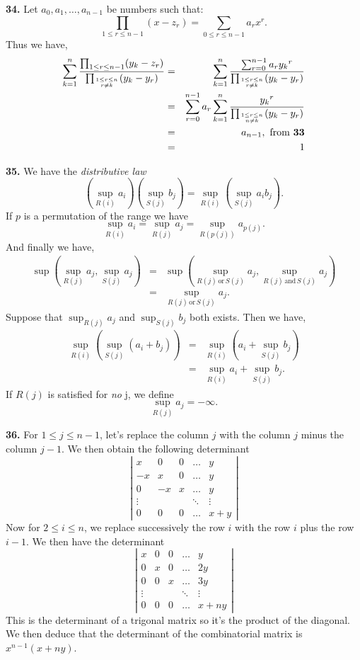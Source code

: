 \documentclass[a4paper,12pt]{article}
\newcommand{\newpar}[1]{\bigskip \noindent \textbf{#1.}}
\begin{document}
\newpar{34} Let $a_0, a_1, \ldots, a_{n-1}$ be numbers such that:
\[\prod_{1\le r\le n-1}(x - z_r) = \sum_{0\le r \le n-1}a_r x^r.\]
Thus we have,
\begin{eqnarray*}
\sum_{k=1}^n\frac{\prod_{1\le r \le n-1}(y_k - z_r)}
{\prod_{1\le r\le n\atop r\not= k}(y_k - y_r)} &=&
\sum_{k=1}^n\frac{\sum_{r=0}^{n-1}a_r y_k{}^r}
{\prod_{1\le r\le n\atop r\not= k}(y_k - y_r)}\\&=&
\sum_{r=0}^{n-1}a_r\sum_{k=1}^n\frac{y_k{}^r}
{\prod_{1\le r\le n\atop n\not= k}(y_k - y_r)}\\&=&
a_{n-1}, \mbox{ from \textbf{33}}\\&=&
1
\end{eqnarray*}

\newpar{35} We have the \emph{distributive law}
\[\left(\sup_{R(i)}a_i\right)\left(\sup_{S(j)}b_j\right) =
\sup_{R(i)}\left(\sup_{S(j)}a_ib_j\right).\]
If $p$ is a permutation of the range we have
\[\sup_{R(i)}a_i = \sup_{R(j)}a_j = \sup_{R(p(j))}a_{p(j)}.\]
And finally we have,
\begin{eqnarray*}
\sup\left(\sup_{R(j)}a_j, \sup_{S(j)}a_j\right) &=&
\sup\left(\sup_{R(j) \,\mathrm{or}\,S(j)}a_j,
	  \sup_{R(j) \,\mathrm{and}\,S(j)}a_j\right) \\&=&
\sup_{R(j)\,\mathrm{or}\,S(j)}a_j.
\end{eqnarray*}
Suppose that $\sup_{R(j)}a_j$ and $\sup_{S(j)}b_j$ both exists.  Then
we have,
\begin{eqnarray*}
\sup_{R(i)}\left(\sup_{S(j)}(a_i+b_j)\right) &=&
\sup_{R(i)}\left(a_i + \sup_{S(j)}b_j\right) \\&=&
\sup_{R(i)}a_i + \sup_{S(j)}b_j.
\end{eqnarray*}
If $R(j)$ is satisfied for \emph{no} j, we define
\[ \sup_{R(j)}a_j = -\infty.\]

\newpar{36}  For $1\le j\le n-1$, let's replace the column $j$ with
the column $j$ minus the column $j-1$.  We then obtain the following
determinant
\[ \left| \begin{array}{ccccc}
  x & 0 & 0 & \ldots & y \\
  -x & x & 0 & \ldots & y \\
  0  & -x & x& \ldots & y \\
  \vdots & & & \ddots & \vdots \\
  0 & 0 & 0 & \ldots & x+y
\end{array} \right|\]
Now for $2\le i \le n$, we replace successively the row $i$ with the
row $i$ plus the row $i-1$.   We then have the determinant
\[ \left| \begin{array}{ccccc}
  x & 0 & 0 & \ldots & y \\
  0 & x & 0 & \ldots & 2y \\
  0 & 0 & x & \ldots & 3y \\
  \vdots & & & \ddots & \vdots \\
  0 & 0 & 0 & \ldots & x + ny
\end{array} \right|\]
This is the determinant of a trigonal matrix so it's the product of
the diagonal.  We then deduce that the determinant of the
combinatorial matrix is $x^{n-1}(x+ny)$.
\end{document}
